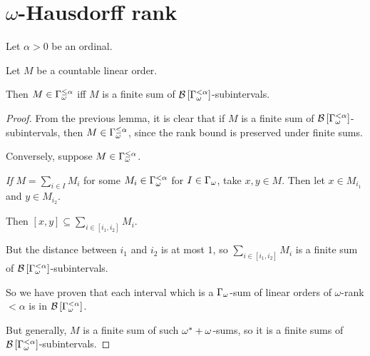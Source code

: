 \section{\texorpdfstring{$\omega$}{omega}-Hausdorff rank}

\begin{lemma}
  Let $\alpha > 0$ be an ordinal.

  Let $M$ be a countable linear order.

  Then $M \in \Gamma_{\omega}^{\le \alpha}$ iff $M$ is a finite sum of $\mathcal{B} \left[ {{\Gamma_{\omega}^{< \alpha}}} \right]$-subintervals.
\end{lemma}

\begin{proof}
  From the previous lemma, it is clear that if $M$ is a finite sum of $\mathcal{B} \left[ {{\Gamma_{\omega}^{< \alpha}}} \right]$-subintervals,
  then $M \in \Gamma_{\omega}^{\le \alpha}$, since the rank bound is preserved under finite sums.

  Conversely, suppose $M \in \Gamma_{\omega}^{\le \alpha}$.

  \emph{If} $M = \sum_{i \in I} M_i$ for some $M_i \in \Gamma_{\omega}^{< \alpha}$ for $I \in \Gamma_{\omega}$,
  take $x, y \in M$. Then let $x \in M_{i_1}$ and $y \in M_{i_2}$.

  Then $[x, y] \subseteq \sum_{i \in [i_1, i_2]} M_i$.

  But the distance between $i_1$ and $i_2$ is at most $1$, so $\sum_{i \in [i_1, i_2]} M_i$ is a finite sum of
  $\mathcal{B} \left[ {{\Gamma_{\omega}^{< \alpha}}} \right]$-subintervals.

  So we have proven that each interval which is a $\Gamma_{\omega}$-sum of linear orders of
  $\omega$-rank $< \alpha$ is in $\mathcal{B} \left[ {{\Gamma_{\omega}^{< \alpha}}} \right]$.

  But generally, $M$ is a finite sum of such $\omega^\ast + \omega$-sums, so it is a finite sums
  of $\mathcal{B} \left[ {{\Gamma_{\omega}^{< \alpha}}} \right]$-subintervals.
\end{proof}

